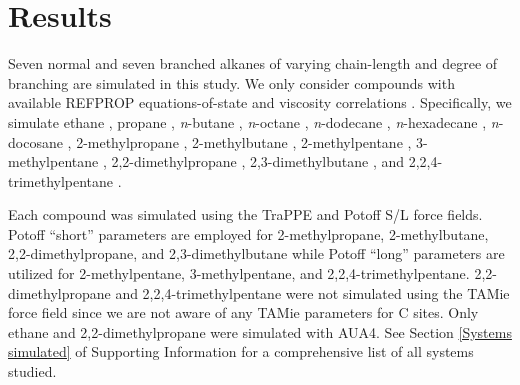 \documentclass[preprint,review,12pt]{elsarticle}
\begin{document}
	  
	
%	
%	
%	
%	
%	
%	
%	
%	
	
	\section{Results} \label{Results}
	
	Seven normal and seven branched alkanes of varying chain-length and degree of branching are simulated in this study. We only consider compounds with available REFPROP equations-of-state and viscosity correlations \cite{LEMMON-RP91}. Specifically, we simulate ethane \cite{Ethane2006,Vogel2015}, propane \cite{Propane2009,Vogel2016}, \textit{n}-butane \cite{Butane2006,Hermann2018}, \textit{n}-octane \cite{Beckmueller2017,Huber2004FPE}, \textit{n}-dodecane \cite{Lemmon2004,Huber2004}, \textit{n}-hexadecane \cite{Romeo2018,Vesovic2017}, \textit{n}-docosane \cite{Romeo2018,Huber2018}, 2-methylpropane \cite{Lemmon2006,Vogel2000}, 2-methylbutane \cite{Lemmon2006,Huber2018}, 2-methylpentane \cite{Lemmon2006,Huber2018}, 3-methylpentane \cite{Gao2017,Huber2018}, 2,2-dimethylpropane \cite{Lemmon2006,Huber2018}, 2,3-dimethylbutane \cite{Gao2017,Huber2018}, and 2,2,4-trimethylpentane \cite{Blackham2017,Huber2018}. 
	
	Each compound was simulated using the TraPPE and Potoff S/L force fields. Potoff ``short'' parameters are employed for 2-methylpropane, 2-methylbutane, 2,2-dimethylpropane, and 2,3-dimethylbutane while Potoff ``long'' parameters are utilized for 2-methylpentane, 3-methylpentane, and 2,2,4-trimethylpentane. 2,2-dimethylpropane and 2,2,4-trimethylpentane were not simulated using the TAMie force field since we are not aware of any TAMie parameters for C sites. Only ethane and 2,2-dimethylpropane were simulated with AUA4. See Section \ref{Systems simulated} of Supporting Information for a comprehensive list of all systems studied.
	
\end{document}

